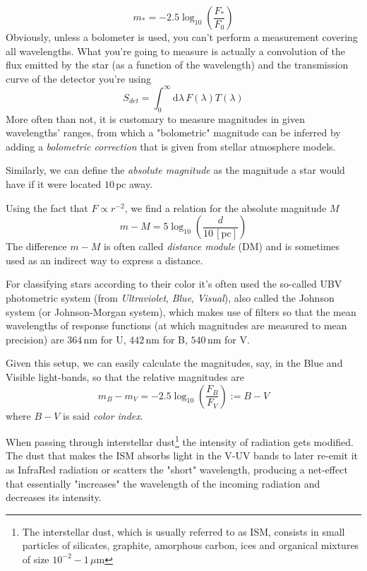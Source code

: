 \begin{equation}
    m_{*} = -2.5\log_{10}\left(\frac{F_{*}}{F_{0}}\right)
    \label{eq:apparentmagnitude}
\end{equation}
Obviously, unless a bolometer is used, you can't perform a measurement covering all wavelengths. What you're going to measure is actually a convolution of the flux emitted by the star (as a function of the wavelength) and the transmission curve of the detector you're using
\begin{equation*}
    S_{det} = \int_{0}^{\infty} \text{d}\lambda\, F(\lambda)T(\lambda)
\end{equation*}
More often than not, it is customary to measure magnitudes in given wavelengths' ranges, from which a "bolometric" magnitude can be inferred by adding a \emph{bolometric correction} that is given from stellar atmosphere models.
\par Similarly, we can define the \emph{absolute magnitude} as the magnitude a star would have if it were located $10\,\text{pc}$ away.
\par Using the fact that $F \propto r^{-2}$, we find a relation for the absolute magnitude $M$
\begin{equation}
    m-M = 5\log_{10}\left(\frac{d}{10\,[\text{pc}]}\right)
    \label{eq:absolutemagnitude}
\end{equation}
The difference $m-M$ is often called \emph{distance module} (DM) and is sometimes used as an indirect way to express a distance.
\par For classifying stars according to their color it's often used the so-called UBV photometric system (from \emph{Ultraviolet}, \emph{Blue}, \emph{Visual}), also called the Johnson system (or Johnson-Morgan system), which makes use of filters so that the mean wavelengths of response functions (at which magnitudes are measured to mean precision) are $364\, \text{nm}$ for U, $442\, \text{nm}$ for B, $540\, \text{nm}$ for V.
\par Given this setup, we can easily calculate the magnitudes, say, in the Blue and Visible light-bands, so that the relative magnitudes are
\begin{equation*}
    m_{B}-m_{V} = -2.5\log_{10}\left(\frac{F_{B}}{F_{V}}\right) := B-V
\end{equation*}
where $B-V$ is said \emph{color index}.
\par When passing through interstellar dust\footnote{The interstellar dust, which is usually referred to as ISM, consists in small particles of silicates, graphite, amorphous carbon, ices and organical mixtures of size $10^{-2}-1\,\mu\text{m}$} the intensity of radiation gets modified. The dust that makes the ISM absorbs light in the V-UV bands to later re-emit it as InfraRed radiation or scatters the "short" wavelength, producing a net-effect that essentially "increases" the wavelength of the incoming radiation and decreases its intensity.
